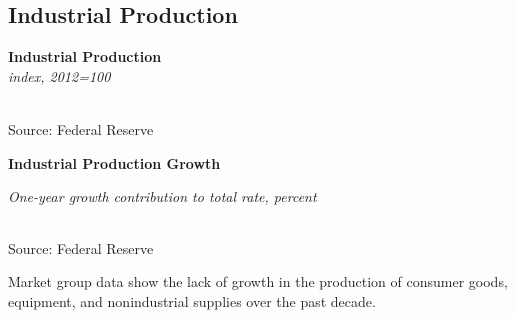 \documentclass{report}
\makeatletter
\newcommand{\tbllink}[1]{\href{https://raw.githubusercontent.com/bdecon/US-chartbook/master/chartbook/data/#1}{\faTable}}
\newcommand*\short[1]{\expandafter\@gobbletwo\number\numexpr#1\relax}
\newcommand{\shdateaxisticks}{
		date coordinates in=x, axis line style={draw=none},
		xmax={2022-03-15},
		max space between ticks=40,	    
		xtick={{1990-01-01}, {1995-01-01}, {2000-01-01}, 
			{2005-01-01}, {2010-01-01}, {2015-01-01}, {2020-01-01}},
		minor xtick={},
		enlarge y limits={0.06}, enlarge x limits={0.01},
		}
\newcommand{\bbar}[2]{extra #1 ticks = {{#2}}, extra #1 tick labels = ,
		extra #1 tick style = {grid=major, grid style={thick, black!25}},}
\newcommand{\thinline}[4]{\addplot[no markers, color=#1] 
		table [x=#2, y=#3, col sep=comma] {#4};	}
\newcommand{\rbars}{
		\fill[color=black!10] (axis cs:{1990-07-01},\pgfkeysvalueof{/pgfplots/ymin}) rectangle 
			(axis cs:{1991-03-01}, \pgfkeysvalueof{/pgfplots/ymax});
		\fill[color=black!10] (axis cs:{2007-12-01},\pgfkeysvalueof{/pgfplots/ymin}) rectangle 
			(axis cs:{2009-07-01}, \pgfkeysvalueof{/pgfplots/ymax});
		\fill[color=black!10] (axis cs:{2001-03-01},\pgfkeysvalueof{/pgfplots/ymin}) rectangle 
			(axis cs:{2001-11-01}, \pgfkeysvalueof{/pgfplots/ymax});
		\fill[color=black!10] (axis cs:{2020-02-01},\pgfkeysvalueof{/pgfplots/ymin}) rectangle 
			(axis cs:{2020-05-01}, \pgfkeysvalueof{/pgfplots/ymax});}
\makeatother
\begin{document}
{\subsection*{Industrial Production}
\hypertarget{busip}{}
\begin{minipage}{0.6\textwidth}
\small  
\end{minipage}\hspace{7mm}
\begin{minipage}{0.37\textwidth}
\normalsize \textbf{Industrial Production}\\
\footnotesize{\textit{index, 2012=100}}\\
\noindent \hspace*{-2mm} \\
\footnotesize{Source: Federal Reserve} \hfill \tbllink{indpro.csv}
\end{minipage}
\vspace{1mm} 

\begin{minipage}{0.76\textwidth}
\normalsize \textbf{Industrial Production Growth}\\
\footnotesize{\textit{One-year growth \hspace{34mm} contribution to total \hspace{12mm} rate, percent}\\
\noindent {} \setlength{\tabcolsep}{3.1pt} \color{black!90}
		{\renewcommand{\arraystretch}{1.54}
		 \begin{tabular}{p{2mm} p{44mm} R{7.3mm} R{7.3mm} R{7.3mm} R{7.3mm} | R{8mm} R{7.3mm} 
		   R{7.3mm} R{7.3mm} }
			  \hline
		\end{tabular}}\vspace{-2mm}
		
\footnotesize{Source: Federal Reserve}}
\end{minipage}
\newpage
\begin{minipage}{0.76\textwidth}
\vspace{3mm}
\small Market group data show the lack of growth in the production of consumer goods, equipment, and nonindustrial supplies over the past decade.
\vspace{1mm}


\end{minipage}}
\end{document}
